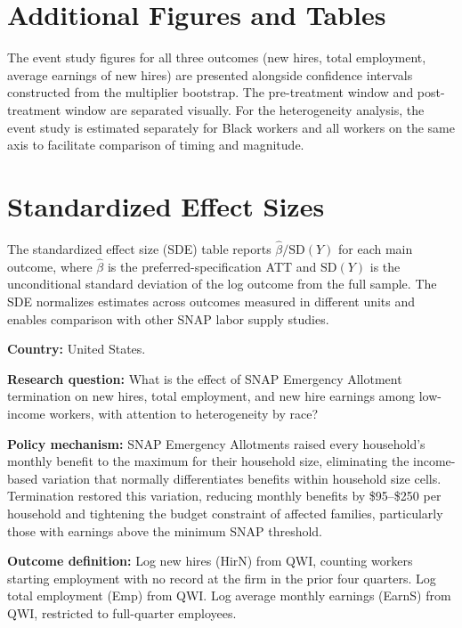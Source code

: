 \documentclass[12pt]{article}
\begin{document}
\section{Additional Figures and Tables}
\label{sec:additional}


The event study figures for all three outcomes (new hires, total employment, average earnings of new hires) are presented alongside confidence intervals constructed from the multiplier bootstrap. The pre-treatment window and post-treatment window are separated visually. For the heterogeneity analysis, the event study is estimated separately for Black workers and all workers on the same axis to facilitate comparison of timing and magnitude.

\section{Standardized Effect Sizes}
\label{sec:sde}



The standardized effect size (SDE) table reports $\hat{\beta} / \text{SD}(Y)$ for each main outcome, where $\hat{\beta}$ is the preferred-specification ATT and $\text{SD}(Y)$ is the unconditional standard deviation of the log outcome from the full sample. The SDE normalizes estimates across outcomes measured in different units and enables comparison with other SNAP labor supply studies.

\noindent\textbf{Country:} United States.

\noindent\textbf{Research question:} What is the effect of SNAP Emergency Allotment termination on new hires, total employment, and new hire earnings among low-income workers, with attention to heterogeneity by race?

\noindent\textbf{Policy mechanism:} SNAP Emergency Allotments raised every household's monthly benefit to the maximum for their household size, eliminating the income-based variation that normally differentiates benefits within household size cells. Termination restored this variation, reducing monthly benefits by \$95--\$250 per household and tightening the budget constraint of affected families, particularly those with earnings above the minimum SNAP threshold.

\noindent\textbf{Outcome definition:} Log new hires (HirN) from QWI, counting workers starting employment with no record at the firm in the prior four quarters. Log total employment (Emp) from QWI. Log average monthly earnings (EarnS) from QWI, restricted to full-quarter employees.
\end{document}
